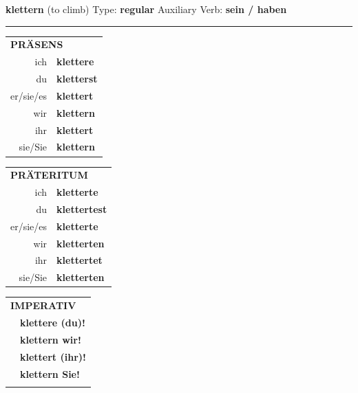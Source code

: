 \documentclass[10pt,a4paper]{revtex4-2}
\begin{document}
\begin{verbbox}
    {\Large \bf klettern} (to climb) \hfill Type: \textbf{regular} \hfill Auxiliary Verb: \textbf{sein / haben} 
    
     \vspace{5pt}

    \hrule
    
    \vspace{5pt}

  \begin{tabular}{rl}
     \multicolumn{2}{l}{\textbf{PRÄSENS} }\\
    ich & \textbf{klettere}\\
    du & \textbf{kletterst}\\
    er/sie/es & \textbf{klettert}\\
    wir & \textbf{klettern}\\
    ihr & \textbf{klettert}\\
    sie/Sie & \textbf{klettern}\\
  \end{tabular}
  \hfill
     \begin{tabular}{rl}
    \multicolumn{2}{l}{\textbf{PRÄTERITUM} }\\
    ich & \textbf{kletterte}\\
    du & \textbf{klettertest}\\
    er/sie/es & \textbf{kletterte}\\
    wir & \textbf{kletterten}\\
    ihr & \textbf{klettertet}\\
    sie/Sie & \textbf{kletterten}\\
  \end{tabular}
  \hfill
  \begin{tabular}{rl}
     \multicolumn{2}{l}{\textbf{IMPERATIV} }\\
   & \textbf{klettere (du)!}\\
   & \textbf{klettern wir!}\\
   & \textbf{klettert (ihr)!}\\
   & \textbf{klettern Sie!}\\
   & \vspace{10pt}
  \end{tabular}

    \vspace{10pt}


\end{verbbox}
\end{document}
